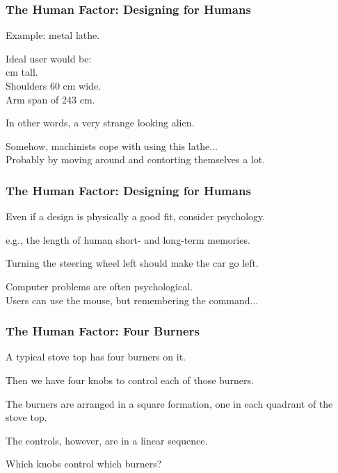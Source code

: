 \begin{frame}
\frametitle{The Human Factor: Designing for Humans}
\begin{changemargin}{1cm}
Example: metal lathe.

Ideal user would be: \\
	 cm tall.\\
	\quad Shoulders 60 cm wide.\\
	\quad Arm span of 243 cm. 
	
	In other words, a very strange looking alien. 
	
	Somehow, machinists cope with using this lathe... \\
	\quad Probably by moving around and contorting themselves a lot. 

\end{changemargin}
\end{frame}

\begin{frame}
\frametitle{The Human Factor: Designing for Humans}
\begin{changemargin}{1cm}
Even if a design is physically a good fit, consider psychology.

e.g., the length of human short- and long-term memories.

Turning the steering wheel left should make the car go left.

Computer problems are often psychological.\\
\quad Users can use the mouse, but remembering the command...

\end{changemargin}
\end{frame}


\begin{frame}
\frametitle{The Human Factor: Four Burners}
\begin{changemargin}{1cm}
A typical stove top has four burners on it. 

Then we have four knobs to control each of those burners. 

The burners are arranged in a square formation, one in each quadrant of the stove top. 

The controls, however, are in a linear sequence. 

Which knobs control which burners?



\end{changemargin}
\end{frame}


